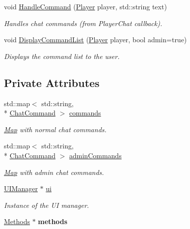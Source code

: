 \begin{DoxyCompactItemize}
void \hyperlink{classCommandManager_a42082bb9a76c725e58aa9c327dd41080}{Handle\-Command} (\hyperlink{structPlayer}{Player} player, std\-::string text)
\begin{DoxyCompactList}\small\item\em Handles chat commands (from Player\-Chat callback). \end{DoxyCompactList}\item 
void \hyperlink{classCommandManager_a463e9c8106c7c509d3c56134c673b767}{Display\-Command\-List} (\hyperlink{structPlayer}{Player} player, bool admin=true)
\begin{DoxyCompactList}\small\item\em Displays the command list to the user. \end{DoxyCompactList}\end{DoxyCompactItemize}
\subsection*{Private Attributes}
\begin{DoxyCompactItemize}
\item 
\hypertarget{classCommandManager_ac192b6e14a4c2c99deff93445f59b97b}{std\-::map$<$ std\-::string, \\*
\hyperlink{structChatCommand}{Chat\-Command} $>$ \hyperlink{classCommandManager_ac192b6e14a4c2c99deff93445f59b97b}{commands}}\label{classCommandManager_ac192b6e14a4c2c99deff93445f59b97b}

\begin{DoxyCompactList}\small\item\em \hyperlink{structMap}{Map} with normal chat commands. \end{DoxyCompactList}\item 
\hypertarget{classCommandManager_ad3d77a995f6ee7fc46c74a5ce146da34}{std\-::map$<$ std\-::string, \\*
\hyperlink{structChatCommand}{Chat\-Command} $>$ \hyperlink{classCommandManager_ad3d77a995f6ee7fc46c74a5ce146da34}{admin\-Commands}}\label{classCommandManager_ad3d77a995f6ee7fc46c74a5ce146da34}

\begin{DoxyCompactList}\small\item\em \hyperlink{structMap}{Map} with admin chat commands. \end{DoxyCompactList}\item 
\hypertarget{classCommandManager_a650cf2a7fc83f6ba193e3ba095c9bc33}{\hyperlink{classUIManager}{U\-I\-Manager} $\ast$ \hyperlink{classCommandManager_a650cf2a7fc83f6ba193e3ba095c9bc33}{ui}}\label{classCommandManager_a650cf2a7fc83f6ba193e3ba095c9bc33}

\begin{DoxyCompactList}\small\item\em Instance of the U\-I manager. \end{DoxyCompactList}\item 
\hypertarget{classCommandManager_a457bc5b1599cb70507ea74672b65b37d}{\hyperlink{classMethods}{Methods} $\ast$ {\bfseries methods}}\label{classCommandManager_a457bc5b1599cb70507ea74672b65b37d}

\end{DoxyCompactItemize}


